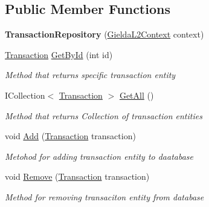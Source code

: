 \subsection*{Public Member Functions}
\begin{DoxyCompactItemize}
\item 
\mbox{\label{class_gielda_l2_1_1_i_n_f_r_a_s_t_r_u_c_t_u_r_e_1_1_repositories_1_1_transaction_repository_ae3b8010b143473902595d74b942ebc81}} 
{\bfseries Transaction\+Repository} (\mbox{\hyperlink{class_gielda_l2_1_1_d_b_1_1_gielda_l2_context}{Gielda\+L2\+Context}} context)
\item 
\mbox{\hyperlink{class_gielda_l2_1_1_d_b_1_1_entities_1_1_transaction}{Transaction}} \mbox{\hyperlink{class_gielda_l2_1_1_i_n_f_r_a_s_t_r_u_c_t_u_r_e_1_1_repositories_1_1_transaction_repository_a97d31c2f5374525c76dc08d1ebaa8f52}{Get\+By\+Id}} (int id)
\begin{DoxyCompactList}\small\item\em Method that returns specific transaction entity \end{DoxyCompactList}\item 
I\+Collection$<$ \mbox{\hyperlink{class_gielda_l2_1_1_d_b_1_1_entities_1_1_transaction}{Transaction}} $>$ \mbox{\hyperlink{class_gielda_l2_1_1_i_n_f_r_a_s_t_r_u_c_t_u_r_e_1_1_repositories_1_1_transaction_repository_ac6358b55acc0931a286b83417c937aa2}{Get\+All}} ()
\begin{DoxyCompactList}\small\item\em Method that returns Collection of transaction entities \end{DoxyCompactList}\item 
void \mbox{\hyperlink{class_gielda_l2_1_1_i_n_f_r_a_s_t_r_u_c_t_u_r_e_1_1_repositories_1_1_transaction_repository_a4ec5cb8eba918ee16d2b40644877609a}{Add}} (\mbox{\hyperlink{class_gielda_l2_1_1_d_b_1_1_entities_1_1_transaction}{Transaction}} transaction)
\begin{DoxyCompactList}\small\item\em Metohod for adding transaction entity to daatabase \end{DoxyCompactList}\item 
void \mbox{\hyperlink{class_gielda_l2_1_1_i_n_f_r_a_s_t_r_u_c_t_u_r_e_1_1_repositories_1_1_transaction_repository_aff0c2a4944edbe498dd4e2ccbc867679}{Remove}} (\mbox{\hyperlink{class_gielda_l2_1_1_d_b_1_1_entities_1_1_transaction}{Transaction}} transaction)
\begin{DoxyCompactList}\small\item\em Method for removing transaciton entity from database \end{DoxyCompactList}\end{DoxyCompactItemize}
